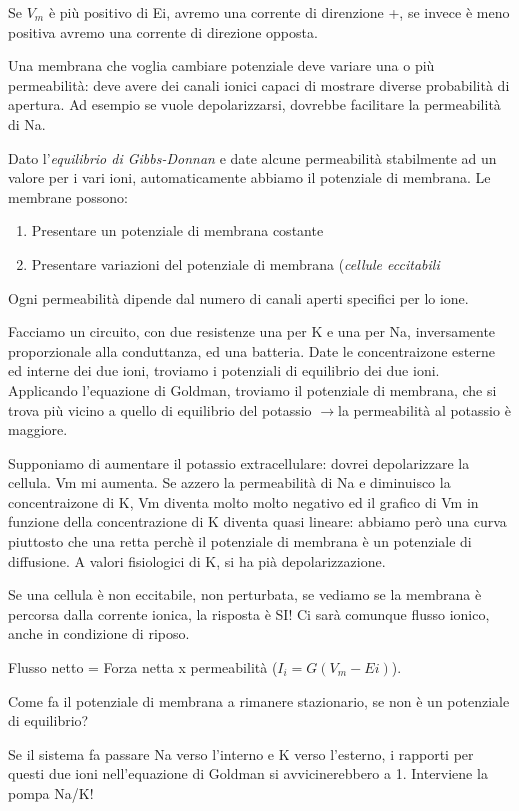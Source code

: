 \documentclass[a4paper,12pt]{article}
\newcommand{\lfreccia}{\ensuremath{\longrightarrow}}
\begin{document}
Se $V_{m}$ è più positivo di Ei, avremo una corrente di direnzione +, se invece è meno positiva avremo una corrente di direzione opposta.

Una membrana che voglia cambiare potenziale deve variare una o più permeabilità: deve avere dei canali ionici capaci di mostrare diverse probabilità di apertura. Ad esempio se vuole depolarizzarsi, dovrebbe facilitare la permeabilità di Na. 

Dato l'\emph{equilibrio di Gibbs-Donnan} e date alcune permeabilità stabilmente ad un valore per i vari ioni, automaticamente abbiamo il potenziale di membrana.
Le membrane possono:
\begin{enumerate}
\item{Presentare un potenziale di membrana costante}
\item{Presentare variazioni del potenziale di membrana (\emph{cellule eccitabili}}
\end{enumerate}

Ogni permeabilità dipende dal numero di canali aperti specifici per lo ione.

Facciamo un circuito, con due resistenze una per K e una per Na, inversamente proporzionale alla conduttanza, ed una batteria. Date le concentraizone esterne ed interne dei due ioni, troviamo i potenziali di equilibrio dei due ioni. Applicando l'equazione di Goldman, troviamo il potenziale di membrana, che si trova più vicino a quello di equilibrio del potassio \lfreccia la permeabilità al potassio è maggiore.

Supponiamo di aumentare il potassio extracellulare: dovrei depolarizzare la cellula.  Vm mi aumenta. Se azzero la permeabilità di Na e diminuisco la concentraizone di K, Vm diventa molto molto negativo ed il grafico di Vm in funzione della concentrazione di K diventa quasi lineare: abbiamo però una curva piuttosto che una retta perchè il potenziale di membrana è un potenziale di diffusione. A valori fisiologici di K, si ha pià depolarizzazione.

Se una cellula è non eccitabile, non perturbata, se vediamo se la membrana è percorsa dalla corrente ionica, la risposta è SI! Ci sarà comunque flusso ionico, anche in condizione di riposo.

Flusso netto = Forza netta x permeabilità ($I_{i}= G(V_{m} - Ei)$).

Come fa il potenziale di membrana a rimanere stazionario, se non è un potenziale di equilibrio?

Se il sistema fa passare Na verso l'interno e K verso l'esterno, i rapporti per questi due ioni nell'equazione di Goldman si avvicinerebbero a 1. Interviene la pompa Na/K!
\end{document}
